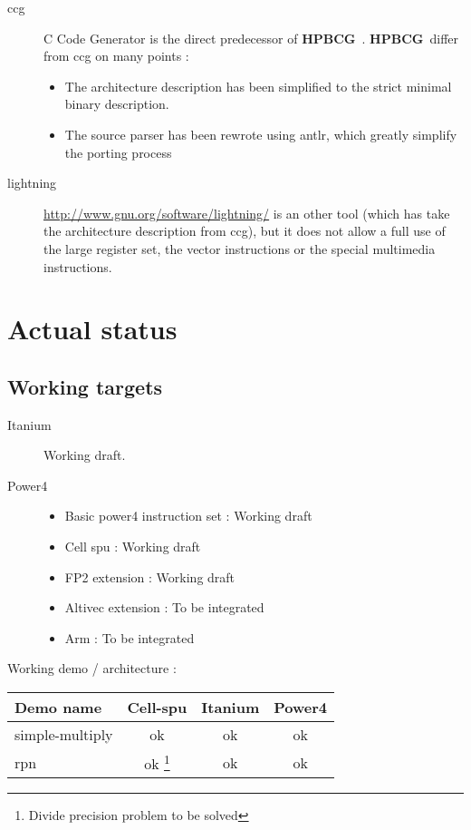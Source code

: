 \documentclass{article}
\newcommand{\hpbcg}{\textbf{HPBCG}\ }
\begin{document}
\begin{description}
\item[ccg] C Code Generator \cite{2001Piumarta} is the direct
  predecessor of \hpbcg. \hpbcg differ from ccg on many points :
  \begin{itemize}
  \item The architecture description has been simplified to the strict
    minimal binary description.
  \item The source parser has been rewrote using antlr, which greatly
    simplify the porting process
  \end{itemize}
\item[lightning] \url{http://www.gnu.org/software/lightning/} is an
  other tool (which has take the architecture description from ccg),
  but it does not allow a full use of the large register set, the
  vector instructions or the special multimedia instructions.
\end{description}

\section{Actual status}

\subsection{Working targets}

\begin{description}
\item[Itanium]  Working draft.
\item[Power4]  
  \begin{itemize}
    \item Basic power4 instruction set : Working draft
    \item Cell spu : Working draft 
    \item FP2 extension : Working draft
    \item Altivec extension : To be integrated
    \item Arm : To be integrated
  \end{itemize}
\end{description}

Working demo / architecture :

\begin{tabular}{|l | c c c|} \hline
  Demo name       & Cell-spu & Itanium  & Power4\\ \hline
  simple-multiply & ok       & ok       & ok \\ \hline
  rpn             & ok \footnote{Divide precision problem to be solved}      & ok  & ok \\ \hline
\end{tabular}
\end{document}
